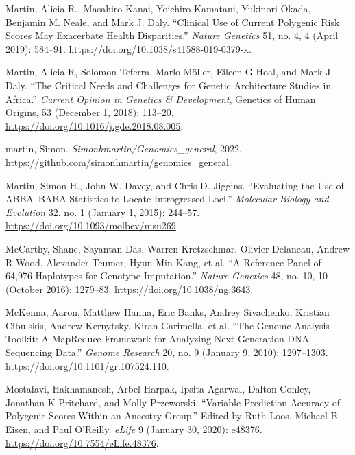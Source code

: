 \documentclass[
]{book}
\newlength{\cslhangindent}
\newlength{\cslentryspacingunit} %
\newenvironment{CSLReferences}[2] %
 {%
  \setlength{\parindent}{0pt}
  \ifodd #1
  \let\oldpar\par
  \def\par{\hangindent=\cslhangindent\oldpar}
  \fi
  \setlength{\parskip}{#2\cslentryspacingunit}
 }%
 {}
\begin{document}
\begin{CSLReferences}{1}{0}
\leavevmode{}%
Martin, Alicia R., Masahiro Kanai, Yoichiro Kamatani, Yukinori Okada, Benjamin M. Neale, and Mark J. Daly. {``Clinical Use of Current Polygenic Risk Scores May Exacerbate Health Disparities.''} \emph{Nature Genetics} 51, no. 4, 4 (April 2019): 584--91. \url{https://doi.org/10.1038/s41588-019-0379-x}.

\leavevmode{}%
Martin, Alicia R, Solomon Teferra, Marlo Möller, Eileen G Hoal, and Mark J Daly. {``The Critical Needs and Challenges for Genetic Architecture Studies in {Africa}.''} \emph{Current Opinion in Genetics \& Development}, Genetics of {Human Origins}, 53 (December 1, 2018): 113--20. \url{https://doi.org/10.1016/j.gde.2018.08.005}.

\leavevmode{}%
martin, Simon. \emph{Simonhmartin/Genomics\_general}, 2022. \url{https://github.com/simonhmartin/genomics_general}.

\leavevmode{}%
Martin, Simon H., John W. Davey, and Chris D. Jiggins. {``Evaluating the {Use} of {ABBA}--{BABA Statistics} to {Locate Introgressed Loci}.''} \emph{Molecular Biology and Evolution} 32, no. 1 (January 1, 2015): 244--57. \url{https://doi.org/10.1093/molbev/msu269}.

\leavevmode{}%
McCarthy, Shane, Sayantan Das, Warren Kretzschmar, Olivier Delaneau, Andrew R Wood, Alexander Teumer, Hyun Min Kang, et al. {``A Reference Panel of 64,976 Haplotypes for Genotype Imputation.''} \emph{Nature Genetics} 48, no. 10, 10 (October 2016): 1279--83. \url{https://doi.org/10.1038/ng.3643}.

\leavevmode{}%
McKenna, Aaron, Matthew Hanna, Eric Banks, Andrey Sivachenko, Kristian Cibulskis, Andrew Kernytsky, Kiran Garimella, et al. {``The {Genome Analysis Toolkit}: {A MapReduce} Framework for Analyzing Next-Generation {DNA} Sequencing Data.''} \emph{Genome Research} 20, no. 9 (January 9, 2010): 1297--1303. \url{https://doi.org/10.1101/gr.107524.110}.

\leavevmode{}%
Mostafavi, Hakhamanesh, Arbel Harpak, Ipsita Agarwal, Dalton Conley, Jonathan K Pritchard, and Molly Przeworski. {``Variable Prediction Accuracy of Polygenic Scores Within an Ancestry Group.''} Edited by Ruth Loos, Michael B Eisen, and Paul O'Reilly. \emph{eLife} 9 (January 30, 2020): e48376. \url{https://doi.org/10.7554/eLife.48376}.


\end{CSLReferences}
\end{document}
